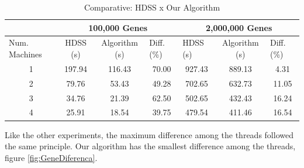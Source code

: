 \documentclass[journal]{IEEEtran}
\begin{document}
\begin{table}[htb]
\centering
\caption{Comparative: HDSS x Our Algorithm}

\begin{tabular}{c|c|c|c|c|c|c|}
\cline{2-7}
\multicolumn{1}{l|}{}                 & \multicolumn{3}{c|}{100,000 Genes}                              & \multicolumn{3}{c|}{2,000,000 Genes}                                                  \\ \hline
\multicolumn{1}{|l|}{Num. Machines} & HDSS (s) & Algorithm (s) & \multicolumn{1}{l|}{Diff. (\%)} & \multicolumn{1}{l|}{HDSS (s)} & Algorithm (s) & \multicolumn{1}{l|}{Diff. (\%)} \\ \hline
\multicolumn{1}{|c|}{1 }       &197.94     & 116.43              & 70.00                         & 927.43                         & 889.13              &           4.31                 \\ \hline
\multicolumn{1}{|c|}{2 }      & 79.76     & 53.43              & 49.28                            & 702.65                          & 632.73              & 11.05                           \\ \hline
\multicolumn{1}{|c|}{3 }      & 34.76     & 21.39              & 62.50                            & 502.65                          & 432.43             &               16.24                  \\ \hline
\multicolumn{1}{|c|}{4 }      & 25.91     & 18.54              & 39.75                            & 479.54                          & 411.46             &               16.54  \\ \hline
\end{tabular}
\label{table: gene}
\end{table}

Like the other experiments, the maximum difference among the threads followed the same principle. Our algorithm has the smallest difference among the threads, figure \ref{fig:GeneDiferenca}.
\end{document}

